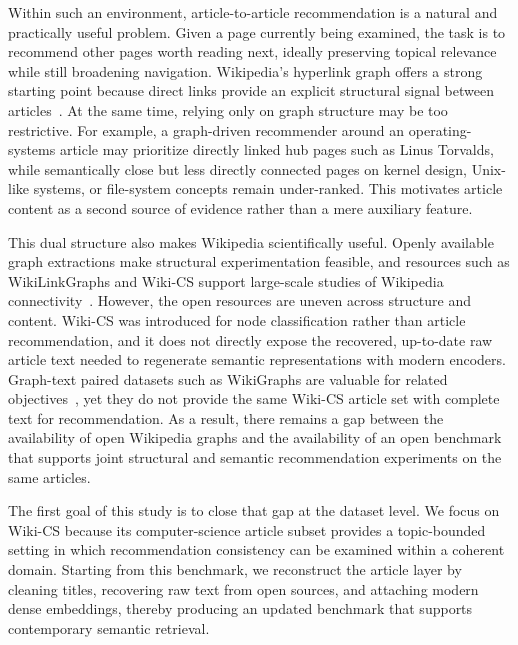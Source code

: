 \documentclass[runningheads]{llncs}
\begin{document}
Within such an environment, article-to-article recommendation is a natural and
practically useful problem. Given a page currently being examined, the task is
to recommend other pages worth reading next, ideally preserving topical
relevance while still broadening navigation. Wikipedia's hyperlink graph offers
a strong starting point because direct links provide an explicit structural
signal between articles~\cite{wikirecnet2020,grover2016node2vec}.
At the same time, relying only on graph structure may be too restrictive. For
example, a graph-driven recommender around an operating-systems article may
prioritize directly linked hub pages such as Linus Torvalds, while
semantically close but less directly connected pages on kernel design,
Unix-like systems, or file-system concepts remain under-ranked. This motivates
article content as a second source of evidence rather than a mere auxiliary
feature.

This dual structure also makes Wikipedia scientifically useful.
Openly available graph extractions make structural experimentation feasible, and
resources such as WikiLinkGraphs and Wiki-CS support large-scale studies of
Wikipedia connectivity~\cite{consonni2019wikilinkgraphs,mernyei2020wikics}. However, the open
resources are uneven across structure and content. Wiki-CS was introduced for
node classification rather than article recommendation, and it does not
directly expose the recovered, up-to-date raw article text needed to
regenerate semantic representations with modern encoders. Graph-text paired
datasets such as WikiGraphs are valuable for related objectives~\cite{wikigraphs2021},
yet they do not provide the same Wiki-CS article set with complete text for
recommendation. As a result, there remains a gap
between the availability of open Wikipedia graphs and the availability of an
open benchmark that supports joint structural and semantic recommendation
experiments on the same articles.

The first goal of this study is to close that gap at the dataset level. We
focus on Wiki-CS because its computer-science article subset provides a
topic-bounded setting in which recommendation consistency can be examined
within a coherent domain. Starting from this benchmark, we reconstruct the
article layer by cleaning titles, recovering raw text from open sources, and
attaching modern dense embeddings, thereby producing an updated benchmark that
supports contemporary semantic retrieval.
\end{document}
